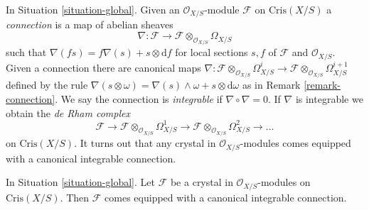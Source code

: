 \noindent
In Situation \ref{situation-global}.
Given an $\mathcal{O}_{X/S}$-module $\mathcal{F}$ on $\text{Cris}(X/S)$
a {\it connection} is a map of abelian sheaves
$$
\nabla :
\mathcal{F}
\longrightarrow
\mathcal{F} \otimes_{\mathcal{O}_{X/S}} \Omega_{X/S}
$$
such that $\nabla(f s) = f\nabla(s) + s \otimes \text{d}f$
for local sections $s, f$ of $\mathcal{F}$ and $\mathcal{O}_{X/S}$.
Given a connection there are canonical maps
$
\nabla :
\mathcal{F} \otimes_{\mathcal{O}_{X/S}} \Omega^i_{X/S}
\longrightarrow
\mathcal{F} \otimes_{\mathcal{O}_{X/S}} \Omega^{i + 1}_{X/S}
$
defined by the rule $\nabla(s \otimes \omega) =
\nabla(s) \wedge \omega + s \otimes \text{d}\omega$
as in Remark \ref{remark-connection}. We say the connection is
{\it integrable} if $\nabla \circ \nabla = 0$. If $\nabla$ is integrable
we obtain the {\it de Rham complex}
$$
\mathcal{F} \to
\mathcal{F} \otimes_{\mathcal{O}_{X/S}} \Omega^1_{X/S} \to
\mathcal{F} \otimes_{\mathcal{O}_{X/S}} \Omega^2_{X/S} \to \ldots
$$
on $\text{Cris}(X/S)$. It turns out that any crystal in
$\mathcal{O}_{X/S}$-modules comes equipped with a canonical
integrable connection.

\begin{lemma}
\label{lemma-automatic-connection}
In Situation \ref{situation-global}.
Let $\mathcal{F}$ be a crystal in $\mathcal{O}_{X/S}$-modules
on $\text{Cris}(X/S)$. Then $\mathcal{F}$ comes equipped with a
canonical integrable connection.
\end{lemma}

